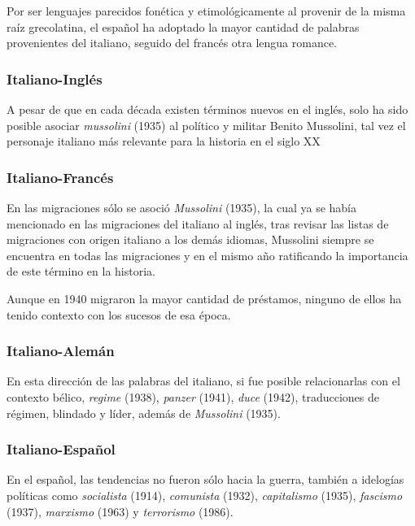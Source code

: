 Por ser lenguajes parecidos fonética y etimológicamente al provenir de la misma raíz grecolatina,  el español ha adoptado la mayor cantidad de palabras provenientes del italiano,  seguido del francés otra lengua romance.  

\subsubsection*{Italiano-Inglés}

A pesar de que en cada década existen términos nuevos en el inglés, solo ha sido posible asociar \textit{mussolini} (1935) al político y militar Benito Mussolini, tal vez el personaje italiano más relevante para la historia en el siglo XX 

\subsubsection*{Italiano-Francés}



En las migraciones sólo se asoció \textit{Mussolini} (1935), la cual ya se había mencionado en las migraciones del italiano al inglés, tras revisar las listas de migraciones con origen italiano  a los demás idiomas, Mussolini siempre se encuentra en todas las migraciones y en el mismo año ratificando la importancia de este término en la historia. 

Aunque en 1940 migraron la mayor cantidad de préstamos, ninguno de ellos ha tenido contexto con los sucesos de esa época. 

\subsubsection*{Italiano-Alemán}

En esta dirección de las palabras del italiano, si fue posible relacionarlas con el contexto bélico,  \textit{regime} (1938), \textit{panzer} (1941), \textit{duce} (1942),  traducciones de régimen, blindado y líder, además de \textit{Mussolini} (1935). 



\subsubsection*{Italiano-Español}

En el español, las tendencias no fueron sólo hacia la guerra, también a idelogías políticas como \textit{socialista} (1914), \textit{comunista} (1932), \textit{capitalismo} (1935), \textit{fascismo} (1937),  \textit{marxismo} (1963) y \textit{terrorismo} (1986). 



